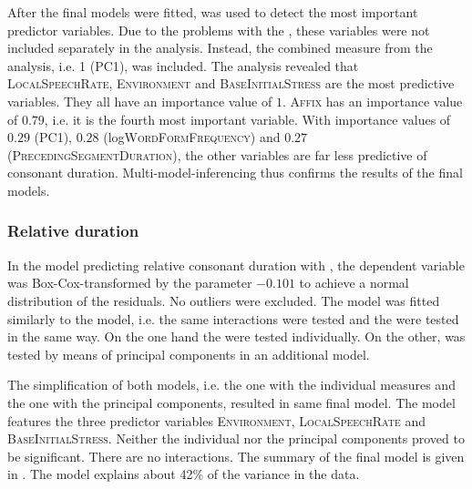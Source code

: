 After the final models were fitted,   was used to detect the most important predictor variables. Due to the  problems with the , these variables were not included separately in the analysis. Instead, the combined  measure from the  analysis, i.e.  1 (\textsc{PC1}), was included.
The analysis revealed that \textsc{LocalSpeechRate}, \textsc{Environment} and \textsc{BaseInitialStress} are the most predictive variables. They all have an importance value of $1$. \textsc{Affix} has an importance value of $0.79$, i.e. it is the fourth most important variable. With importance values of $0.29$ (\textsc{PC1}), $0.28$ (log\textsc{WordFormFrequency}) and $0.27$ (\textsc{PrecedingSegmentDuration}), the other variables are far less predictive of consonant duration. Multi-model-inferencing thus confirms the results of the final models.


\subsubsection{Relative duration}

In the model predicting relative consonant duration with , the dependent variable was Box-Cox-transformed by the parameter $-0.101$ to achieve a normal distribution of the residuals. No outliers were excluded. The model was fitted similarly to the  model, i.e. the same interactions were tested and the  were tested in the same way. On the one hand the  were tested individually. On the other,  was tested by means of principal components in an additional model. 

The simplification of both models, i.e. the one with the individual measures and the one with the principal components, resulted in same final model. The model features the three predictor variables \textsc{Environment}, \textsc{LocalSpeechRate} and \textsc{BaseInitialStress}. Neither the individual  nor the principal components proved to be significant. There are no interactions. 
The summary of the final model is given in . The model explains about 42\% of the variance in the data.\\





